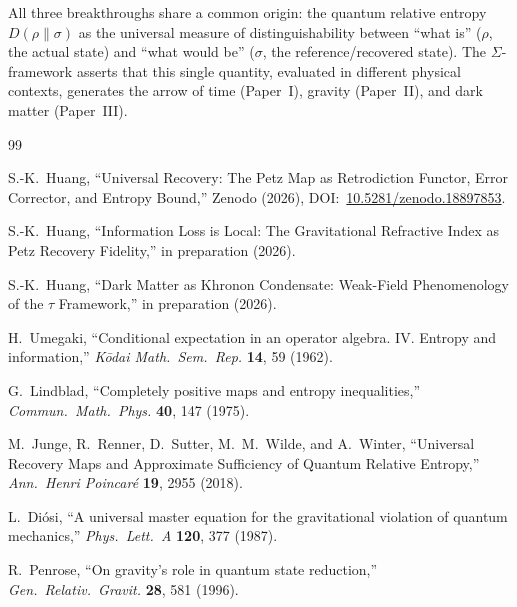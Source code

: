 \documentclass[letterpaper,twocolumn,superscriptaddress,longbibliography]{revtex4-2}
\begin{document}
All three breakthroughs share a common origin: the quantum
relative entropy $D(\rho\|\sigma)$ as the universal measure of
distinguishability between ``what is'' ($\rho$, the actual state)
and ``what would be'' ($\sigma$, the reference/recovered state).
The $\Sigma$-framework asserts that this single quantity, evaluated
in different physical contexts, generates the arrow of time
(Paper~I), gravity (Paper~II), and dark matter (Paper~III).



\begin{thebibliography}{99}


S.-K.~Huang,
``Universal Recovery: The Petz Map as Retrodiction Functor,
Error Corrector, and Entropy Bound,''
Zenodo (2026),
DOI:~\href{https://doi.org/10.5281/zenodo.18897853}{10.5281/zenodo.18897853}.

S.-K.~Huang,
``Information Loss is Local:
The Gravitational Refractive Index as Petz Recovery Fidelity,''
in preparation (2026).

S.-K.~Huang,
``Dark Matter as Khronon Condensate: Weak-Field Phenomenology
of the $\tau$ Framework,''
in preparation (2026).


H.~Umegaki,
``Conditional expectation in an operator algebra. IV.
Entropy and information,''
\textit{K\={o}dai Math.\ Sem.\ Rep.} \textbf{14}, 59 (1962).

G.~Lindblad,
``Completely positive maps and entropy inequalities,''
\textit{Commun.\ Math.\ Phys.} \textbf{40}, 147 (1975).

M.~Junge, R.~Renner, D.~Sutter, M.~M.~Wilde, and A.~Winter,
``Universal Recovery Maps and Approximate Sufficiency of
Quantum Relative Entropy,''
\textit{Ann.\ Henri Poincar\'{e}} \textbf{19}, 2955 (2018).


L.~Di\'{o}si,
``A universal master equation for the gravitational violation
of quantum mechanics,''
\textit{Phys.\ Lett.\ A} \textbf{120}, 377 (1987).

R.~Penrose,
``On gravity's role in quantum state reduction,''
\textit{Gen.\ Relativ.\ Gravit.} \textbf{28}, 581 (1996).


\end{thebibliography}
\end{document}
